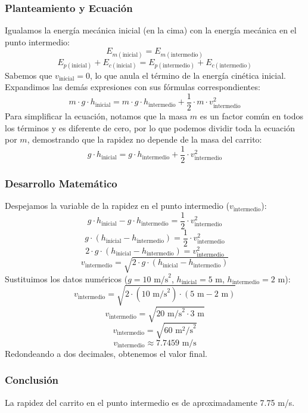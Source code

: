 \documentclass[12pt,a4paper]{article}
\begin{document}
\subsubsection*{Planteamiento y Ecuación}
Igualamos la energía mecánica inicial (en la cima) con la energía mecánica en el punto intermedio:
$$E_{m(\text{inicial})} = E_{m(\text{intermedio})}$$
$$E_{p(\text{inicial})} + E_{c(\text{inicial})} = E_{p(\text{intermedio})} + E_{c(\text{intermedio})}$$
Sabemos que $v_{\text{inicial}} = 0$, lo que anula el término de la energía cinética inicial. Expandimos las demás expresiones con sus fórmulas correspondientes:
$$m \cdot g \cdot h_{\text{inicial}} = m \cdot g \cdot h_{\text{intermedio}} + \frac{1}{2} \cdot m \cdot v_{\text{intermedio}}^2$$
Para simplificar la ecuación, notamos que la masa $m$ es un factor común en todos los términos y es diferente de cero, por lo que podemos dividir toda la ecuación por $m$, demostrando que la rapidez no depende de la masa del carrito:
$$g \cdot h_{\text{inicial}} = g \cdot h_{\text{intermedio}} + \frac{1}{2} \cdot v_{\text{intermedio}}^2$$

\subsubsection*{Desarrollo Matemático}
Despejamos la variable de la rapidez en el punto intermedio ($v_{\text{intermedio}}$):
$$g \cdot h_{\text{inicial}} - g \cdot h_{\text{intermedio}} = \frac{1}{2} \cdot v_{\text{intermedio}}^2$$
$$g \cdot (h_{\text{inicial}} - h_{\text{intermedio}}) = \frac{1}{2} \cdot v_{\text{intermedio}}^2$$
$$2 \cdot g \cdot (h_{\text{inicial}} - h_{\text{intermedio}}) = v_{\text{intermedio}}^2$$
$$v_{\text{intermedio}} = \sqrt{2 \cdot g \cdot (h_{\text{inicial}} - h_{\text{intermedio}})}$$
Sustituimos los datos numéricos ($g = 10 \text{ m/s}^2$, $h_{\text{inicial}} = 5 \text{ m}$, $h_{\text{intermedio}} = 2 \text{ m}$):
$$v_{\text{intermedio}} = \sqrt{2 \cdot (10 \text{ m/s}^2) \cdot (5 \text{ m} - 2 \text{ m})}$$
$$v_{\text{intermedio}} = \sqrt{20 \text{ m/s}^2 \cdot 3 \text{ m}}$$
$$v_{\text{intermedio}} = \sqrt{60 \text{ m}^2\text{/s}^2}$$
$$v_{\text{intermedio}} \approx 7.7459 \text{ m/s}$$
Redondeando a dos decimales, obtenemos el valor final.

\subsubsection*{Conclusión}
La rapidez del carrito en el punto intermedio es de aproximadamente 7.75 m/s.
\end{document}
